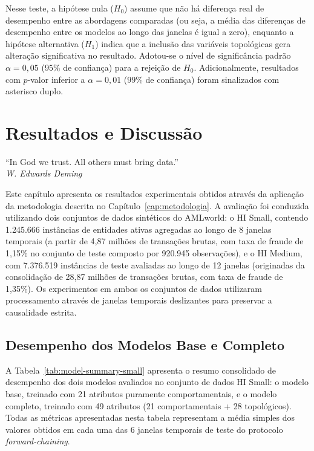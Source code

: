 \documentclass[titlepage,a4paper,oneside,onecolumn,12pt]{report}
\newenvironment{epigrafeonline}{\begin{flushright}\begin{minipage}{0.55\textwidth}}{\end{minipage}\end{flushright}}
\begin{document}
Nesse teste, a hipótese nula ($H_0$) assume que não há diferença real de desempenho entre as abordagens comparadas (ou seja, a média das diferenças de desempenho entre os modelos ao longo das janelas é igual a zero), enquanto a hipótese alternativa ($H_1$) indica que a inclusão das variáveis topológicas gera alteração significativa no resultado. Adotou-se o nível de significância padrão $\alpha = 0{,}05$ ($95\%$ de confiança) para a rejeição de $H_0$. Adicionalmente, resultados com $p$-valor inferior a $\alpha = 0{,}01$ ($99\%$ de confiança) foram sinalizados com asterisco duplo.
\chapter{Resultados e Discussão}

\begin{epigrafeonline}
\hfill ``In God we trust. All others must bring data.''\hspace{0.2cm}\null\\
\hspace*{\fill}\textit{W. Edwards Deming}\\
\end{epigrafeonline}

Este capítulo apresenta os resultados experimentais obtidos através da aplicação da metodologia descrita no Capítulo~\ref{cap:metodologia}. A avaliação foi conduzida utilizando dois conjuntos de dados sintéticos do AMLworld: o HI Small, contendo 1.245.666 instâncias de entidades ativas agregadas ao longo de 8 janelas temporais (a partir de 4,87 milhões de transações brutas, com taxa de fraude de 1,15\% no conjunto de teste composto por 920.945 observações), e o HI Medium, com 7.376.519 instâncias de teste avaliadas ao longo de 12 janelas (originadas da consolidação de 28,87 milhões de transações brutas, com taxa de fraude de 1,35\%). Os experimentos em ambos os conjuntos de dados utilizaram processamento através de janelas temporais deslizantes para preservar a causalidade estrita.

\section{Desempenho dos Modelos Base e Completo}

A Tabela~\ref{tab:model-summary-small} apresenta o resumo consolidado de desempenho dos dois modelos avaliados no conjunto de dados HI Small: o modelo base, treinado com 21 atributos puramente comportamentais, e o modelo completo, treinado com 49 atributos (21 comportamentais + 28 topológicos). Todas as métricas apresentadas nesta tabela representam a média simples dos valores obtidos em cada uma das 6 janelas temporais de teste do protocolo \textit{forward-chaining}.
\end{document}
